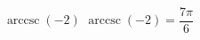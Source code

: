  {$\operatorname{arccsc} \left( -2 \right)$ }
{ $\operatorname{arccsc} \left( -2 \right) = \dfrac{7\pi}{6}$ }
